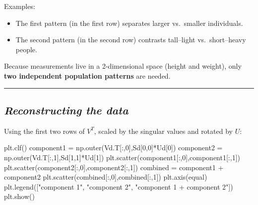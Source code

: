 \documentclass[
  letterpaper,
  DIV=11,
  numbers=noendperiod,
  oneside]{scrartcl}
\newenvironment{Shaded}{\begin{snugshade}}{\end{snugshade}}
\newcommand{\DecValTok}[1]{\textcolor[rgb]{0.68,0.00,0.00}{#1}}
\newcommand{\NormalTok}[1]{\textcolor[rgb]{0.00,0.23,0.31}{#1}}
\newcommand{\OperatorTok}[1]{\textcolor[rgb]{0.37,0.37,0.37}{#1}}
\newcommand{\StringTok}[1]{\textcolor[rgb]{0.13,0.47,0.30}{#1}}
\providecommand{\tightlist}{%
  \setlength{\itemsep}{0pt}\setlength{\parskip}{0pt}}\usepackage{longtable,booktabs,array}
\begin{document}
Examples:

\begin{itemize}
\tightlist
\item
  The first pattern (in the first row) separates larger vs.~smaller
  individuals.
\item
  The second pattern (in the second row) contrasts tall--light
  vs.~short--heavy people.
\end{itemize}

Because measurements live in a 2-dimensional space (height and weight),
only \textbf{two independent population patterns} are needed.

\begin{center}\rule{0.5\linewidth}{0.5pt}\end{center}

\subsection{\texorpdfstring{\emph{Reconstructing the
data}}{Reconstructing the data}}\label{reconstructing-the-data}

Using the first two rows of \(V^T\), scaled by the singular values and
rotated by \(U\):

\begin{Shaded}
\begin{Highlighting}[]
\NormalTok{plt.clf()}
\NormalTok{component1 }\OperatorTok{=}\NormalTok{ np.outer(Vd.T[:,}\DecValTok{0}\NormalTok{],Sd[}\DecValTok{0}\NormalTok{,}\DecValTok{0}\NormalTok{]}\OperatorTok{*}\NormalTok{Ud[}\DecValTok{0}\NormalTok{])}
\NormalTok{component2 }\OperatorTok{=}\NormalTok{ np.outer(Vd.T[:,}\DecValTok{1}\NormalTok{],Sd[}\DecValTok{1}\NormalTok{,}\DecValTok{1}\NormalTok{]}\OperatorTok{*}\NormalTok{Ud[}\DecValTok{1}\NormalTok{])}
\NormalTok{plt.scatter(component1[:,}\DecValTok{0}\NormalTok{],component1[:,}\DecValTok{1}\NormalTok{])}
\NormalTok{plt.scatter(component2[:,}\DecValTok{0}\NormalTok{],component2[:,}\DecValTok{1}\NormalTok{])}
\NormalTok{combined }\OperatorTok{=}\NormalTok{ component1 }\OperatorTok{+}\NormalTok{ component2}
\NormalTok{plt.scatter(combined[:,}\DecValTok{0}\NormalTok{],combined[:,}\DecValTok{1}\NormalTok{])}
\NormalTok{plt.axis(}\StringTok{\textquotesingle{}equal\textquotesingle{}}\NormalTok{)}
\NormalTok{plt.legend([}\StringTok{"component 1"}\NormalTok{, }\StringTok{"component 2"}\NormalTok{, }\StringTok{"component 1 + component 2"}\NormalTok{])}
\NormalTok{plt.show()}
\end{Highlighting}
\end{Shaded}
\end{document}
